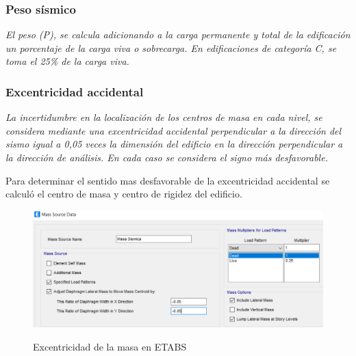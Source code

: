 \documentclass{article}%
\begin{document}
%
\subsubsection{Peso sísmico}%
\label{ssubsec:Pesossmico}%
\begin{tcolorbox}[colback=gray!5!white,colframe=Maroon!75!black,fonttitle=\bfseries,title=Art. 26]%
\textit{El peso (P), se calcula adicionando a la carga permanente y total de la edificación un porcentaje de la carga viva o sobrecarga. En edificaciones de categoría C, se toma el 25\% de la carga viva.}%
\end{tcolorbox}%

%
\subsubsection{Excentricidad accidental}%
\label{ssubsec:Excentricidadaccidental}%
\begin{tcolorbox}[colback=gray!5!white,colframe=Maroon!75!black,fonttitle=\bfseries,title=Art. 28.5]%
\textit{La incertidumbre en la localización de los centros de masa en cada nivel, se considera mediante una excentricidad accidental perpendicular a la dirección del sismo igual a 0,05 veces la dimensión del edificio en la dirección perpendicular a la dirección de análisis. En cada caso se considera el signo más desfavorable.}%
\end{tcolorbox}%
Para determinar el sentido mas desfavorable de la excentricidad accidental se calculó el centro de masa y centro de rigidez del edificio.\\%


\begin{figure}[ht!]%
\centering%
\caption{Excentricidad de la masa en ETABS}%
\includegraphics[scale=0.7]{images/excentricidad.PNG}%
\label{masa}%
\end{figure}

%
\end{document}
